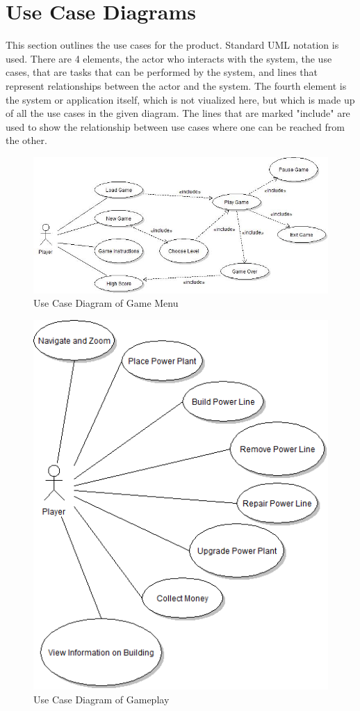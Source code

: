 \section{Use Case Diagrams}

This section outlines the use cases for the product. Standard UML notation is used. There are 4 elements, the actor who interacts with the system, the use cases, that are tasks that can be performed by the system, and lines that represent relationships between the actor and the system. The fourth element is the system or application itself, which is not viualized here, but which is made up of all the use cases in the given diagram. The lines that are marked "include" are used to show the relationship between use cases where one can be reached from the other. \cite{usecaseUML}


\begin{figure}[H]
  	\centering
	\includegraphics[width=\textwidth]{pictures/UCD_Game_Menu_After.jpg}
	\caption{Use Case Diagram of Game Menu}
\end{figure}

\begin{figure}[H]
  	\centering
	\includegraphics[width=\textwidth]{pictures/UCD_PlayGame.png}
	\caption{Use Case Diagram of Gameplay}
\end{figure}


